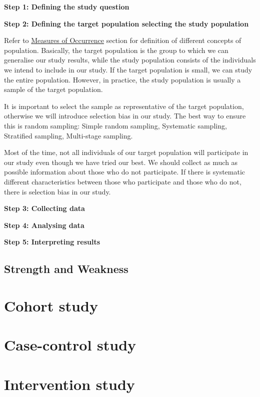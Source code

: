 \documentclass[
  letterpaper,
  DIV=11,
  numbers=noendperiod]{scrreprt}
\begin{document}
\textbf{Step 1: Defining the study question}

\textbf{Step 2: Defining the target population selecting the study
population}

Refer to \protect\hyperlink{measures-of-occurrence}{Measures of
Occurrence} section for definition of different concepts of population.
Basically, the target population is the group to which we can generalise
our study results, while the study population consists of the
individuals we intend to include in our study. If the target population
is small, we can study the entire population. However, in practice, the
study population is usually a sample of the target population.

It is important to select the sample as representative of the target
population, otherwise we will introduce selection bias in our study. The
best way to ensure this is random sampling: Simple random sampling,
Systematic sampling, Stratified sampling, Multi-stage sampling.

Most of the time, not all individuals of our target population will
participate in our study even though we have tried our best. We should
collect as much as possible information about those who do not
participate. If there is systematic different characteristics between
those who participate and those who do not, there is selection bias in
our study.

\textbf{Step 3: Collecting data}

\textbf{Step 4: Analysing data}

\textbf{Step 5: Interpreting results}

\hypertarget{strength-and-weakness}{%
\section{Strength and Weakness}\label{strength-and-weakness}}

\hypertarget{cohort-study}{%
\chapter{Cohort study}\label{cohort-study}}

\hypertarget{case-control-study}{%
\chapter{Case-control study}\label{case-control-study}}

\hypertarget{intervention-study}{%
\chapter{Intervention study}\label{intervention-study}}
\end{document}
